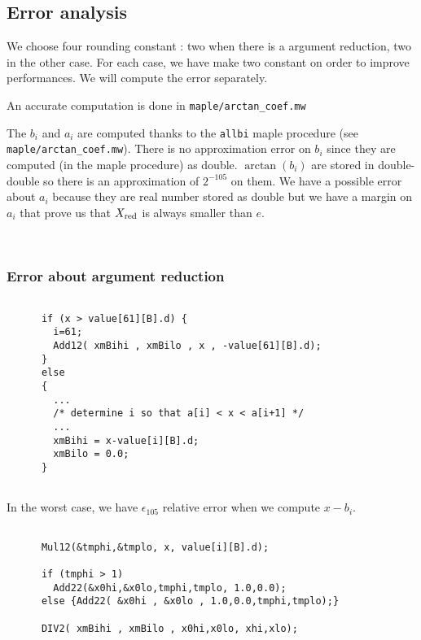 \subsection{Error analysis}

We choose four rounding constant : two when there is a argument reduction, two in
the other case. For each case, we have make two constant on order to
improve performances. We will compute the error separately.

An accurate computation is done in \texttt{maple/arctan\_coef.mw} 

The $b_i$ and $a_i$ are computed thanks to the \texttt{allbi} maple
procedure (see \texttt{maple/arctan\_coef.mw}). There is no approximation
error on $b_i$ since they are computed (in the maple procedure) as
double. $\arctan (b_i)$ are stored in double-double so there is an
approximation of $2^{-105}$ on them. We have a possible error about $a_i$
because they are real number stored as double but we have a margin on $a_i$
that prove us that $X_{\mathrm{red}}$ is always smaller than $e$.

\\
\subsubsection{Error about argument reduction}
\begin{lstlisting}[caption={Reduction part 1},firstnumber=1]

      if (x > value[61][B].d) {
        i=61;
        Add12( xmBihi , xmBilo , x , -value[61][B].d);
      }
      else
      {
        ...
        /* determine i so that a[i] < x < a[i+1] */
        ...          
        xmBihi = x-value[i][B].d;
        xmBilo = 0.0;
      }
      
\end{lstlisting}

In the worst case, we have $\epsilon_{105}$ relative error when we compute
$x-b_i$.

\begin{lstlisting}[caption={Reduction part 2},firstnumber=1]

      Mul12(&tmphi,&tmplo, x, value[i][B].d);

      if (tmphi > 1)
        Add22(&x0hi,&x0lo,tmphi,tmplo, 1.0,0.0);
      else {Add22( &x0hi , &x0lo , 1.0,0.0,tmphi,tmplo);}
      
      DIV2( xmBihi , xmBilo , x0hi,x0lo, xhi,xlo);

\end{lstlisting}

